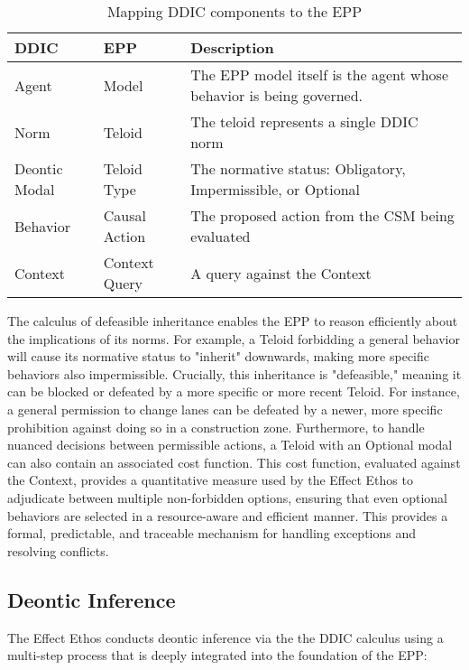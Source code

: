 \begin{table}[h!]
\caption{Mapping DDIC components to the EPP}
\label{tab:mapping-ddic}
\begin{tabular}{|l|l|l|}
\hline
\textbf{DDIC} & \textbf{EPP}  & \textbf{Description}                     \\ \hline
Agent         & Model         & The EPP model itself is the agent whose behavior is being governed. \\ \hline
Norm          & Teloid        & The teloid represents a single DDIC norm \\ \hline
Deontic Modal & Teloid Type   & The normative status: Obligatory, Impermissible, or Optional        \\ \hline
Behavior      & Causal Action & The proposed action from the CSM being evaluated                    \\ \hline
Context       & Context Query & A query against the Context              \\ \hline
\end{tabular}
\end{table}

The calculus of defeasible inheritance enables the EPP to reason efficiently about the implications of its norms. For example, a Teloid forbidding a general behavior will cause its normative status to "inherit" downwards, making more specific behaviors also impermissible. Crucially, this inheritance is "defeasible," meaning it can be blocked or defeated by a more specific or more recent Teloid. For instance, a general permission to change lanes can be defeated by a newer, more specific prohibition against doing so in a construction zone. Furthermore, to handle nuanced decisions between permissible actions, a Teloid with an Optional modal can also contain an associated cost function. This cost function, evaluated against the Context, provides a quantitative measure used by the Effect Ethos to adjudicate between multiple non-forbidden options, ensuring that even optional behaviors are selected in a resource-aware and efficient manner. This provides a formal, predictable, and traceable mechanism for handling exceptions and resolving conflicts. 

\subsection{Deontic Inference}

The Effect Ethos conducts deontic inference via the  the DDIC calculus using a multi-step process that is deeply integrated into the foundation of the EPP:

